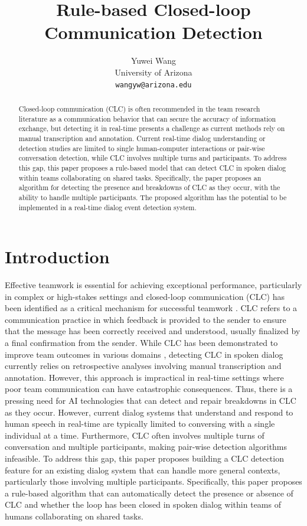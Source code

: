 \documentclass[11pt]{article}
\title{Rule-based Closed-loop Communication Detection}
\author{Yuwei Wang \\
  University of Arizona \\
  \texttt{wangyw@arizona.edu}}
\begin{document}
\maketitle
\begin{abstract}
Closed-loop communication (CLC) is often recommended in the team research literature as a communication behavior that can secure the accuracy of information exchange, but detecting it in real-time presents a challenge as current methods rely on manual transcription and annotation. Current real-time dialog understanding or detection studies are limited to single human-computer interactions or pair-wise conversation detection, while CLC involves multiple turns and participants. To address this gap, this paper proposes a rule-based model that can detect CLC in spoken dialog within teams collaborating on shared tasks. Specifically, the paper proposes an algorithm for detecting the presence and breakdowns of CLC as they occur, with the ability to handle multiple participants. The proposed algorithm has the potential to be implemented in a real-time dialog event detection system.
\end{abstract}

\section{Introduction}

Effective teamwork is essential for achieving exceptional performance, particularly in complex or high-stakes settings and closed-loop communication (CLC) has been identified as a critical mechanism for successful teamwork \citep{salas2005there}. CLC refers to a communication practice in which feedback is provided to the sender to ensure that the message has been correctly received and understood, usually finalized by a final confirmation from the sender. While CLC has been demonstrated to improve team outcomes in various domains \citep{hargestam2016trauma, abd2018closed, bostrom2020mind}, detecting CLC in spoken dialog currently relies on retrospective analyses involving manual transcription and annotation. However, this approach is impractical in real-time settings where poor team communication can have catastrophic consequences. Thus, there is a pressing need for AI technologies that can detect and repair breakdowns in CLC as they occur. However, current dialog systems that understand and respond to human speech in real-time are typically limited to conversing with a single individual at a time. Furthermore, CLC often involves multiple turns of conversation and multiple participants, making pair-wise detection algorithms infeasible. To address this gap, this paper proposes building a CLC detection feature for an existing dialog system that can handle more general contexts, particularly those involving multiple participants. Specifically, this paper proposes a rule-based algorithm that can automatically detect the presence or absence of CLC and whether the loop has been closed in spoken dialog within teams of humans collaborating on shared tasks.
\end{document}
